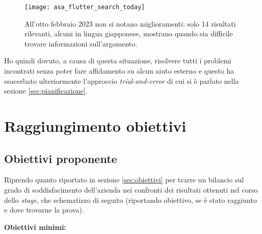 \begin{figure}[H]
  \centering
  \texttt{[image: asa\_flutter\_search\_today]}
  \caption[Ricerca esatta Flutter e ASA 8 febbraio]{All'otto febbraio 2023 non si notano miglioramenti: solo 14 risultati rilevanti, alcuni in lingua giapponese, mostrano quando sia difficile trovare informazioni sull'argomento.}
  \label{fig:search2}
\end{figure}

Ho quindi dovuto, a causa di questa situazione, risolvere tutti i problemi incontrati senza poter fare affidamento su alcun aiuto esterno e questo ha esacerbato ulteriormente l'approccio \textit{trial-and-error} di cui si è parlato nella sezione \ref{sec:pianificazione}.


\section{Raggiungimento obiettivi}
\subsection{Obiettivi proponente}
Riprendo quanto riportato in sezione \ref{sec:obiettivi} per trarre un bilancio sul grado di soddisfacimento dell'azienda nei confronti dei risultati ottenuti nel corso dello \textit{stage}, che schematizzo di seguito (riportando obiettivo, se è stato raggiunto e dove trovarne la prova).

\aCapo{}
\textbf{Obiettivi minimi:}

